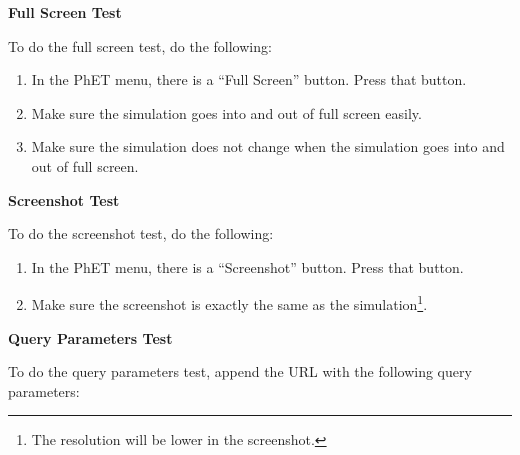 \documentclass[titlepage]{article}
\begin{document}
\textbf{Full Screen Test}

To do the full screen test, do the following:

		\begin{enumerate}
			\item In the PhET menu, there is a ``Full Screen'' button. Press that button.
			\item Make sure the simulation goes into and out of full screen easily.
			\item Make sure the simulation does not change when the simulation goes into and out of full screen.
		\end{enumerate}

\textbf{Screenshot Test}

To do the screenshot test, do the following:

		\begin{enumerate}
			\item In the PhET menu, there is a ``Screenshot'' button. Press that button.
			\item Make sure the screenshot is exactly the same as the simulation\footnote{The resolution will be lower in the screenshot.}.
		\end{enumerate}

\textbf{Query Parameters Test}

To do the query parameters test, append the URL with the following query parameters:
\end{document}
